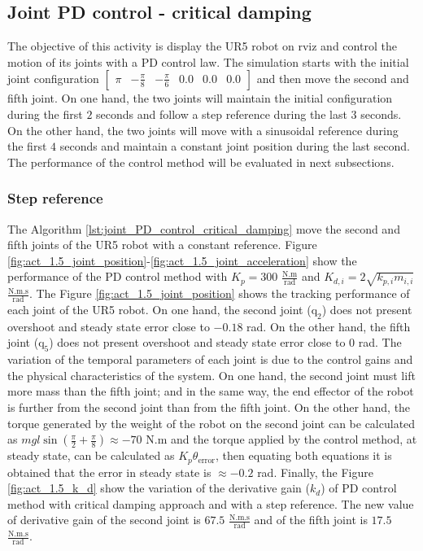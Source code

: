 \subsection{Joint PD control - critical damping}
The objective of this activity is display the UR5 robot on rviz and control the motion of its joints with a PD control law. The simulation starts with the initial joint configuration $\begin{bmatrix} \pi & -\frac{\pi}{8} & -\frac{\pi}{6} & 0.0 & 0.0 & 0.0 \end{bmatrix}$ and then move the second and fifth joint. On one hand, the two joints will maintain the initial configuration during the first $2$ seconds and follow a step reference during the last $3$ seconds. On the other hand, the two joints  will move with a sinusoidal reference during the first $4$ seconds and  maintain a constant joint position during the last second. The performance of the control method will be evaluated in next subsections.

\subsubsection{Step reference}
The Algorithm \ref{lst:joint_PD_control_critical_damping} move the second and fifth joints of the UR5 robot with a constant reference. Figure \ref{fig:act_1.5_joint_position}-\ref{fig:act_1.5_joint_acceleration} show the performance of the PD control method with $K_p=300$ $\mathrm{\frac{N.m}{rad}}$ and $K_{d,i}= 2 \sqrt{k_{p,i} m_{i,i}} $ $\mathrm{\frac{N.m.s}{rad}}$. The Figure \ref{fig:act_1.5_joint_position} shows the tracking performance of each joint of the UR5 robot. On one hand, the second joint ($\mathrm{q}_2$) does not present overshoot and steady state error close to $-0.18$ rad. On the other hand, the fifth joint ($\mathrm{q}_5$) does not present overshoot and steady state error close to $0$ rad. The variation of the temporal parameters of each joint is due to the control gains and the physical characteristics of the system. On one hand, the second joint must lift more mass than the fifth joint; and in the same way, the end effector of the robot is further from the second joint than from the fifth joint. On the other hand, the torque generated by the weight of the robot on the second joint can be calculated as $m g l \sin({\frac{\pi}{2} + \frac{\pi}{8}}) \approx -70$ N.m and the torque applied by the control method, at steady state, can be calculated as $K_p \theta_{\mathrm{error}}$, then equating both equations it is obtained that the error in steady state is $\approx -0.2$ rad. Finally, the Figure \ref{fig:act_1.5_k_d} show the variation of the derivative gain ($k_d$) of PD control method with critical damping approach and with a step reference. The new value of derivative gain of the second joint is $67.5$ $\mathrm{\frac{N.m.s}{rad}}$ and of the fifth joint is $17.5$ $\mathrm{\frac{N.m.s}{rad}}$. 

